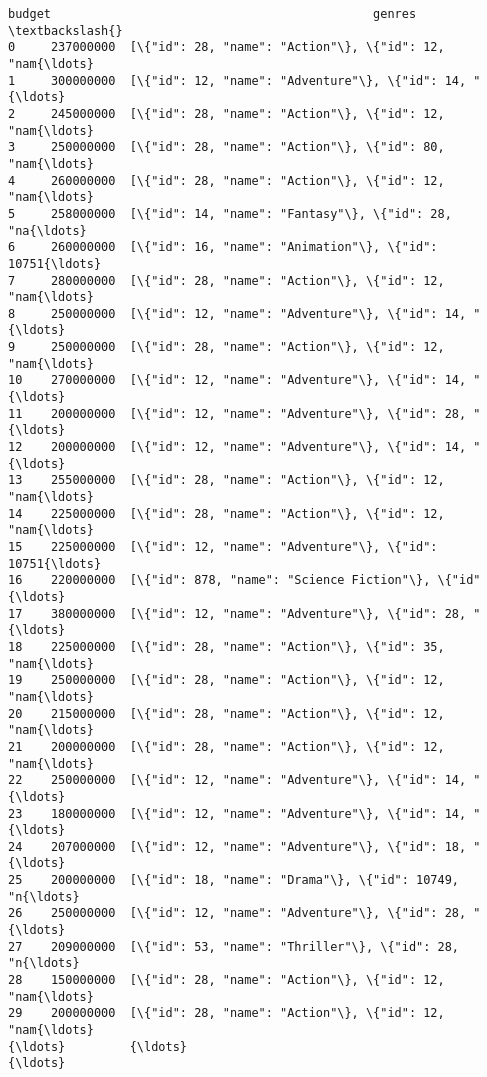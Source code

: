 \documentclass[11pt]{article}
\begin{document}
    \begin{Verbatim}[commandchars=\\\{\}]
         budget                                             genres  \textbackslash{}
0     237000000  [\{"id": 28, "name": "Action"\}, \{"id": 12, "nam{\ldots}   
1     300000000  [\{"id": 12, "name": "Adventure"\}, \{"id": 14, "{\ldots}   
2     245000000  [\{"id": 28, "name": "Action"\}, \{"id": 12, "nam{\ldots}   
3     250000000  [\{"id": 28, "name": "Action"\}, \{"id": 80, "nam{\ldots}   
4     260000000  [\{"id": 28, "name": "Action"\}, \{"id": 12, "nam{\ldots}   
5     258000000  [\{"id": 14, "name": "Fantasy"\}, \{"id": 28, "na{\ldots}   
6     260000000  [\{"id": 16, "name": "Animation"\}, \{"id": 10751{\ldots}   
7     280000000  [\{"id": 28, "name": "Action"\}, \{"id": 12, "nam{\ldots}   
8     250000000  [\{"id": 12, "name": "Adventure"\}, \{"id": 14, "{\ldots}   
9     250000000  [\{"id": 28, "name": "Action"\}, \{"id": 12, "nam{\ldots}   
10    270000000  [\{"id": 12, "name": "Adventure"\}, \{"id": 14, "{\ldots}   
11    200000000  [\{"id": 12, "name": "Adventure"\}, \{"id": 28, "{\ldots}   
12    200000000  [\{"id": 12, "name": "Adventure"\}, \{"id": 14, "{\ldots}   
13    255000000  [\{"id": 28, "name": "Action"\}, \{"id": 12, "nam{\ldots}   
14    225000000  [\{"id": 28, "name": "Action"\}, \{"id": 12, "nam{\ldots}   
15    225000000  [\{"id": 12, "name": "Adventure"\}, \{"id": 10751{\ldots}   
16    220000000  [\{"id": 878, "name": "Science Fiction"\}, \{"id"{\ldots}   
17    380000000  [\{"id": 12, "name": "Adventure"\}, \{"id": 28, "{\ldots}   
18    225000000  [\{"id": 28, "name": "Action"\}, \{"id": 35, "nam{\ldots}   
19    250000000  [\{"id": 28, "name": "Action"\}, \{"id": 12, "nam{\ldots}   
20    215000000  [\{"id": 28, "name": "Action"\}, \{"id": 12, "nam{\ldots}   
21    200000000  [\{"id": 28, "name": "Action"\}, \{"id": 12, "nam{\ldots}   
22    250000000  [\{"id": 12, "name": "Adventure"\}, \{"id": 14, "{\ldots}   
23    180000000  [\{"id": 12, "name": "Adventure"\}, \{"id": 14, "{\ldots}   
24    207000000  [\{"id": 12, "name": "Adventure"\}, \{"id": 18, "{\ldots}   
25    200000000  [\{"id": 18, "name": "Drama"\}, \{"id": 10749, "n{\ldots}   
26    250000000  [\{"id": 12, "name": "Adventure"\}, \{"id": 28, "{\ldots}   
27    209000000  [\{"id": 53, "name": "Thriller"\}, \{"id": 28, "n{\ldots}   
28    150000000  [\{"id": 28, "name": "Action"\}, \{"id": 12, "nam{\ldots}   
29    200000000  [\{"id": 28, "name": "Action"\}, \{"id": 12, "nam{\ldots}   
{\ldots}         {\ldots}                                                {\ldots}   

\end{Verbatim}
\end{document}
